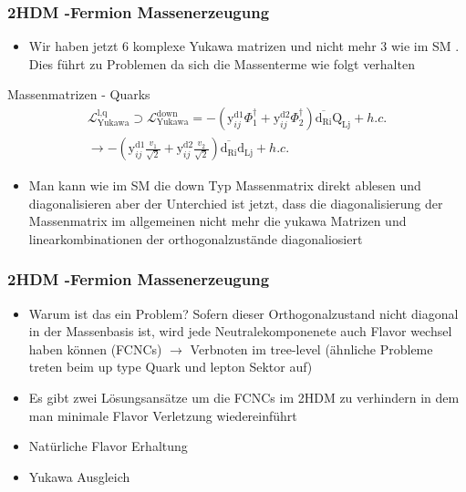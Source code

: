 \documentclass{beamer}
\begin{document}
\begin{frame}
\frametitle{2HDM -Fermion Massenerzeugung}
\begin{itemize}
\item Wir haben jetzt 6 komplexe Yukawa matrizen und nicht mehr 3 wie im SM . Dies führt zu Problemen da sich die  Massenterme wie folgt verhalten
\end{itemize}
\begin{block}{Massenmatrizen - Quarks }
\begin{equation*}
\begin{split}
\mathscr{L}_{\text{Yukawa}}^{\text{l,q}}\supset \mathscr{L}_{\text{Yukawa}}^{\text{down}} =-(\text{y}^{\text{d1}}_{ij}\Phi_{1}^{\dagger}+\text{y}^{\text{d2}}_{ij}\Phi_{2}^{\dagger})\overline{\text{d}_{\text{Ri}}}\text{Q}_{\text{Lj}} +h.c. \\
\rightarrow -(\text{y}^{\text{d1}}_{ij}\frac{v_{1}}{\sqrt{2}}+\text{y}^{\text{d2}}_{ij}\frac{v_{2}}{\sqrt{2}})\overline{\text{d}_{\text{Ri}}}\text{d}_{\text{Lj}} +h.c. 
\end{split}
\end{equation*}
\end{block}

\begin{itemize}
\item Man kann wie im SM die down Typ Massenmatrix direkt ablesen und diagonalisieren aber der Unterchied ist jetzt, dass die diagonalisierung der Massenmatrix  im allgemeinen nicht mehr die yukawa Matrizen und linearkombinationen der orthogonalzustände diagonaliosiert 
\end{itemize}
\end{frame}
\begin{frame}[t]
\frametitle{2HDM -Fermion Massenerzeugung}
\begin{itemize}

\item Warum ist das ein Problem? Sofern dieser Orthogonalzustand nicht diagonal in der Massenbasis ist, wird jede Neutralekomponenete  auch Flavor wechsel haben können (FCNCs) $\rightarrow$ Verbnoten im tree-level (ähnliche Probleme treten beim up type Quark und lepton Sektor auf)



\item Es gibt zwei Lösungsansätze um die FCNCs im 2HDM zu verhindern in dem man minimale Flavor Verletzung wiedereinführt
\item Natürliche Flavor Erhaltung
\item Yukawa Ausgleich 
\end{itemize}

\end{frame}
\end{document}
